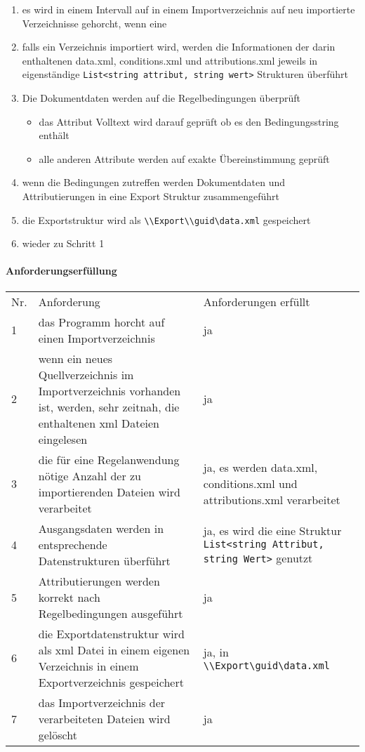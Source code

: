 \documentclass[11pt,oneside,a4paper,notitlepage]{article}
\begin{document}
\begin{enumerate}
\item es wird in einem Intervall auf in einem Importverzeichnis auf neu importierte Verzeichnisse gehorcht, wenn eine
\item falls ein Verzeichnis importiert wird, werden die Informationen der darin enthaltenen data.xml, conditions.xml und attributions.xml jeweils in eigenständige \verb+List<string attribut, string wert>+ Strukturen überführt
\item Die Dokumentdaten werden auf die Regelbedingungen überprüft
\begin{itemize}
\item das Attribut Volltext wird darauf geprüft ob es den Bedingungsstring enthält
\item alle anderen Attribute werden auf exakte Übereinstimmung geprüft
\end{itemize}
\item wenn die Bedingungen zutreffen werden Dokumentdaten und Attributierungen in eine Export Struktur zusammengeführt
\item die Exportstruktur wird als \verb+\\Export\\guid\data.xml+ gespeichert
\item wieder zu Schritt 1
\end{enumerate}



\paragraph*{Anforderungserfüllung}
%
\begin{center}
\begin{tabular}{| p{20mm} | p{80mm} | p{60mm} |}
\hline
Nr. & Anforderung & Anforderungen erfüllt\\
1 & das Programm horcht auf einen Importverzeichnis & ja\\
\hline
2 & wenn ein neues Quellverzeichnis im Importverzeichnis vorhanden ist, werden, sehr zeitnah, die enthaltenen xml Dateien eingelesen & ja\\
\hline
3 & die für eine Regelanwendung nötige Anzahl der zu importierenden Dateien wird verarbeitet & ja, es werden data.xml, conditions.xml und attributions.xml verarbeitet\\
\hline
4 & Ausgangsdaten werden in entsprechende Datenstrukturen überführt & ja, es wird die eine Struktur \verb+List<string Attribut, string Wert>+ genutzt\\
\hline
5 & Attributierungen werden korrekt nach Regelbedingungen ausgeführt & ja\\
\hline
6 & die Exportdatenstruktur wird als xml Datei in einem eigenen Verzeichnis in einem Exportverzeichnis gespeichert & ja, in \verb+\\Export\guid\data.xml+ \\
\hline
7 & das Importverzeichnis der verarbeiteten Dateien wird gelöscht & ja \\
\hline
\end{tabular}
\end{center}
\end{document}
